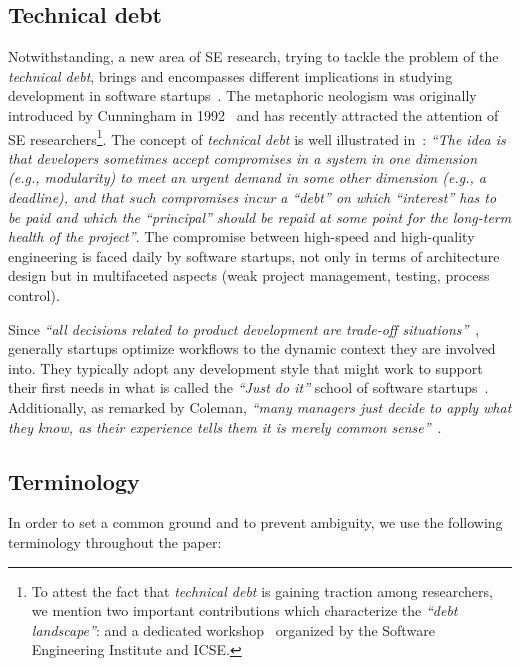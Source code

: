 \documentclass[10pt,journal,letterpaper,compsoc]{IEEEtran}
\begin{document}
\subsection{Technical debt} Notwithstanding, a new area of SE research,
trying to tackle the problem of the \textit{technical debt}, brings and
encompasses different implications in studying development in software 
startups~\cite{Tom2013}. The metaphoric neologism was originally introduced by
Cunningham in 1992~\cite{TechnicalDebtCunn} and has recently attracted the
attention of SE researchers\footnote{To attest the fact that \textit{technical
debt} is gaining traction among researchers, we mention two important
contributions which characterize the \textit{``debt landscape''}:
\cite{Nugroho2011,Izurieta2012} and a dedicated workshop~\cite{workshopDebt}
organized by the Software Engineering Institute and ICSE.}. The concept of
\textit{technical debt} is well illustrated 
in~\cite{Brown:2010:MTD:1882362.1882373}: \textit{``The idea is that developers
sometimes accept compromises in a system in one dimension (e.g., modularity) to
meet an urgent demand in some other dimension (e.g., a deadline), and that such
compromises incur a ``debt'' on which ``interest'' has to be paid and which the
``principal'' should be repaid at some point for the long-term health of the
project''}. The compromise between high-speed and high-quality engineering is
faced daily by software startups, not only in terms of architecture design but
in multifaceted aspects (weak project management, testing, process control).

Since \textit{``all decisions related to product development are trade-off
situations''}~\cite{Hilmola2003}, generally startups optimize workflows to the
dynamic context they are involved into. They typically adopt any development
style that might work to support their first needs in what is called the
\textit{``Just do it''} school of software startups~\cite{Ries2011}.
Additionally, as remarked by Coleman, \textit{``many managers just decide to
apply what they know, as their experience tells them it is merely common
sense''}~\cite{Coleman2008}.

\subsection{Terminology} In order to set a common ground and to prevent
ambiguity, we use the following terminology throughout the paper:
\end{document}
